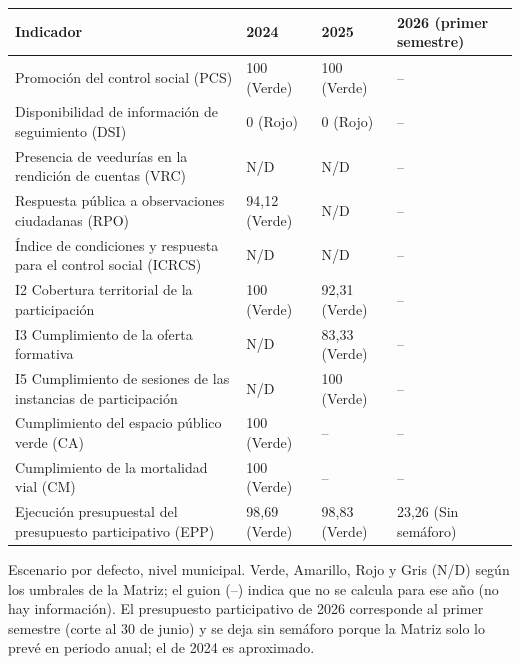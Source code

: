 \documentclass[11pt,letterpaper]{article}
\begin{document}
\begin{center}\footnotesize\begin{tabularx}{\linewidth}{L{6.3cm}YYY}\toprule

\textbf{Indicador} & \textbf{2024} & \textbf{2025} & \textbf{2026 (primer semestre)} \\ \midrule

Promoción del control social (PCS) & 100 (Verde) & 100 (Verde) & -- \\
Disponibilidad de información de seguimiento (DSI) & 0 (Rojo) & 0 (Rojo) & -- \\
Presencia de veedurías en la rendición de cuentas (VRC) & N/D & N/D & -- \\
Respuesta pública a observaciones ciudadanas (RPO) & 94,12 (Verde) & N/D & -- \\
Índice de condiciones y respuesta para el control social (ICRCS) & N/D & N/D & -- \\
I2 Cobertura territorial de la participación & 100 (Verde) & 92,31 (Verde) & -- \\
I3 Cumplimiento de la oferta formativa & N/D & 83,33 (Verde) & -- \\
I5 Cumplimiento de sesiones de las instancias de participación & N/D & 100 (Verde) & -- \\
Cumplimiento del espacio público verde (CA) & 100 (Verde) & -- & -- \\
Cumplimiento de la mortalidad vial (CM) & 100 (Verde) & -- & -- \\
Ejecución presupuestal del presupuesto participativo (EPP) & 98,69 (Verde) & 98,83 (Verde) & 23,26 (Sin semáforo) \\ \bottomrule\end{tabularx}\end{center}

{\footnotesize Escenario por defecto, nivel municipal. \colorbox{cverde}{Verde}, \colorbox{camarillo}{Amarillo}, \colorbox{crojo}{Rojo} y \colorbox{cgris}{Gris (N/D)} según los umbrales de la Matriz; el guion (--) indica que no se calcula para ese año (no hay información). El presupuesto participativo de 2026 corresponde al primer semestre (corte al 30 de junio) y se deja sin semáforo porque la Matriz solo lo prevé en periodo anual; el de 2024 es aproximado.}
\end{document}
